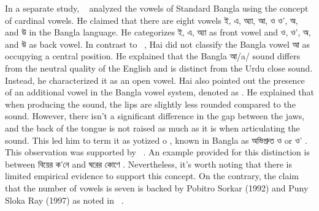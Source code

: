 In a separate study, ~\citet{hai1964dhwonibijnan} analyzed the vowels of Standard Bangla using the concept of cardinal vowels. He claimed that there are eight vowels \textbengali{ই}, \textbengali{এ}, \textbengali{অ্যা},  \textbengali{আ}, \textbengali{ও} \textbengali{ও'}, \textbengali{অ}, and \textbengali{উ} in the Bangla language. He categorizes \textbengali{ই}, \textbengali{এ}, \textbengali{অ্যা} as front vowel and \textbengali{ও}, \textbengali{ও'}, \textbengali{অ}, and \textbengali{উ} as back vowel. In contrast to ~\citet{morshed1997bhashatatwa}, Hai did not classify the Bangla vowel \textbengali{আ} as occupying a central position. He explained that the Bangla \textbengali{আ}/a/ sound differs from the neutral quality of the English  and is distinct from the Urdu close  sound. Instead, he characterized it as an open vowel. Hai also pointed out the presence of an additional vowel in the Bangla vowel system, denoted as . He explained that when producing the  sound, the lips are slightly less rounded compared to the  sound. However, there isn't a significant difference in the gap between the jaws, and the back of the tongue is not raised as much as it is when articulating the  sound. This led him to term it as yotized o , known in Bangla as \textbengali{অভিশ্রুত}  \textbengali{ও}  or \textbengali{ও'} . This observation was supported by ~\citet{huq2002bhasha}. An example provided for this distinction is between \textbengali{বিয়ের ক'নে} and \textbengali{ঘরের কোণে} . Nevertheless, it's worth noting that there is limited empirical evidence to support this concept. On the contrary, the claim that the number of vowels is seven is backed by Pobitro Sorkar (1992) and Puny Sloka Ray (1997) as noted in ~\citet{ali2001dhanibijnaner}.


